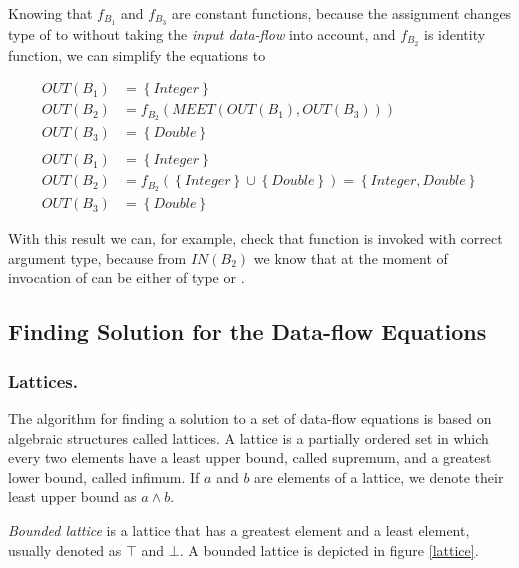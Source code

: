         Knowing that $f_{B_1}$ and $f_{B_3}$ are constant functions, because 
        the assignment changes type of  to  without taking 
        the \emph{input data-flow} into account, and $f_{B_2}$ is identity 
        function, we can simplify the equations to

        \begin{align*}
            OUT(B_1) &= \left\{ \mathit{Integer} \right\} \\
            OUT(B_2) &= f_{B_2}(\mathit{MEET}(OUT(B_1), OUT(B_3))) \\
            OUT(B_3) &= \left\{ \mathit{Double} \right\} \\
            \\
            OUT(B_1) &= \left\{ \mathit{Integer} \right\} \\
            OUT(B_2) &= f_{B_2}( \left\{ \mathit{Integer} \right\} \cup \left\{ \mathit{Double} \right\} ) = 
                \left\{ \mathit{Integer}, \mathit{Double} \right\} \\
            OUT(B_3) &= \left\{ \mathit{Double} \right\}
        \end{align*}
        
        With this result we can, for example, check that function  
        is invoked with correct argument type, because from $IN(B_2)$ we 
        know that  at the moment of invocation of  
        can be either of type  or .
                
        \subsection{Finding Solution for the Data-flow Equations}
        
        \subsubsection*{Lattices.}
        The algorithm for finding a solution to a set of data-flow 
        equations is based on algebraic structures called lattices. 
        A lattice is a partially ordered set in which every 
        two elements have a least upper bound, called supremum, 
        and a greatest lower bound, called infimum. If $a$ and 
        $b$ are elements of a lattice, we denote their least upper 
        bound as $a\wedge{}b$.
        
        \emph{Bounded lattice} is a lattice that has 
        a greatest element and a least element, 
        usually denoted as $\top$ and $\bot$. 
        A bounded lattice is depicted in figure \ref{lattice}.       
        
